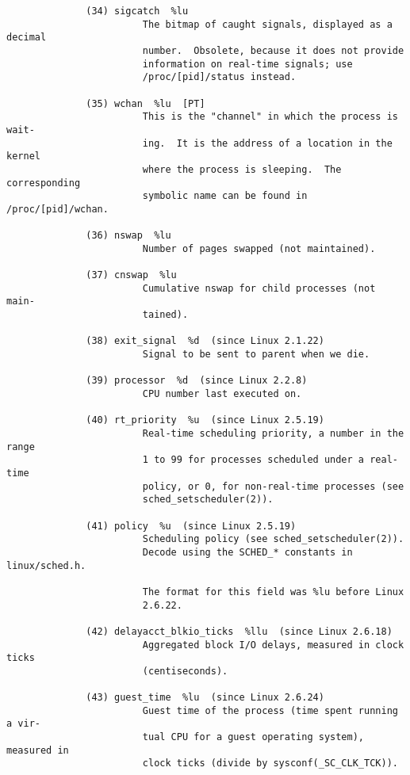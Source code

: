 \documentclass[]{article}
\begin{document}
\begin{verbatim}
              (34) sigcatch  %lu
                        The bitmap of caught signals, displayed as a decimal
                        number.  Obsolete, because it does not provide
                        information on real-time signals; use
                        /proc/[pid]/status instead.

              (35) wchan  %lu  [PT]
                        This is the "channel" in which the process is wait‐
                        ing.  It is the address of a location in the kernel
                        where the process is sleeping.  The corresponding
                        symbolic name can be found in /proc/[pid]/wchan.

              (36) nswap  %lu
                        Number of pages swapped (not maintained).

              (37) cnswap  %lu
                        Cumulative nswap for child processes (not main‐
                        tained).

              (38) exit_signal  %d  (since Linux 2.1.22)
                        Signal to be sent to parent when we die.

              (39) processor  %d  (since Linux 2.2.8)
                        CPU number last executed on.

              (40) rt_priority  %u  (since Linux 2.5.19)
                        Real-time scheduling priority, a number in the range
                        1 to 99 for processes scheduled under a real-time
                        policy, or 0, for non-real-time processes (see
                        sched_setscheduler(2)).

              (41) policy  %u  (since Linux 2.5.19)
                        Scheduling policy (see sched_setscheduler(2)).
                        Decode using the SCHED_* constants in linux/sched.h.

                        The format for this field was %lu before Linux
                        2.6.22.

              (42) delayacct_blkio_ticks  %llu  (since Linux 2.6.18)
                        Aggregated block I/O delays, measured in clock ticks
                        (centiseconds).

              (43) guest_time  %lu  (since Linux 2.6.24)
                        Guest time of the process (time spent running a vir‐
                        tual CPU for a guest operating system), measured in
                        clock ticks (divide by sysconf(_SC_CLK_TCK)).


\end{verbatim}
\end{document}
